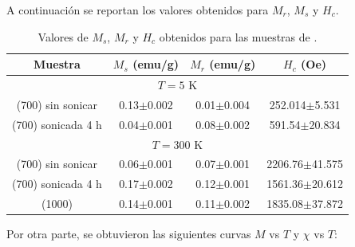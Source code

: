 \documentclass[../main.tex]{subfiles}
\begin{document}
A continuación se reportan los valores obtenidos para $M_r$, $M_s$ y $H_c$.
\begin{table}[H]
    \centering
    \begin{tabular}{|c||c|c|c|}
        \hline 
        Muestra & $M_s$ (emu/g) & $M_r$ (emu/g) & $H_c$ (Oe) \\
        \hline
        \hline
        \multicolumn{4}{|c|}{$T=5$ K} \\
        \hline 
        \sama{} (700\gradoC{}) sin sonicar & 0.13$\pm$0.002 & 0.01$\pm$0.004 & 252.014$\pm$5.531 \\
        \hline
        \sama{} (700\gradoC{}) sonicada 4 h & 0.04$\pm$0.001 & 0.08$\pm$0.002 & 591.54$\pm$20.834 \\
        \hline
        \multicolumn{4}{|c|}{$T=300$ K} \\
        \hline
        \sama{} (700\gradoC{}) sin sonicar & 0.06$\pm$0.001 & 0.07$\pm$0.001 & 2206.76$\pm$41.575 \\
        \hline
        \sama{} (700\gradoC{}) sonicada 4 h & 0.17$\pm$0.002 & 0.12$\pm$0.001 & 1561.36$\pm$20.612 \\
        \hline
        \sama{} (1000\gradoC{}) & 0.14$\pm$0.001 & 0.11$\pm$0.002 & 1835.08$\pm$37.872 \\
        \hline
        \end{tabular} 
    \caption{Valores de $M_s$, $M_r$ y $H_c$ obtenidos para las muestras de \sama{}.}
    \label{tabla:resmvhsama}
\end{table}
Por otra parte, se obtuvieron las siguientes curvas $M$ vs $T$ y $\chi$ vs $T$:
\end{document}
